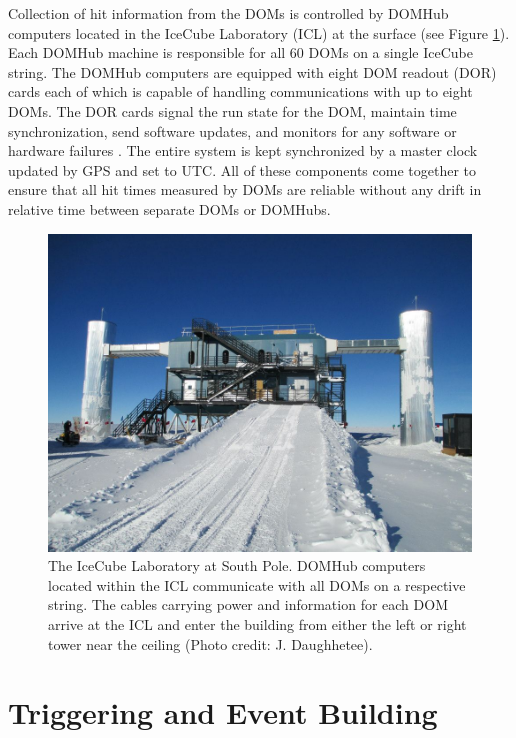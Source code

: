 \documentclass{gatech-thesis}
\begin{document}
Collection of hit information from the DOMs is controlled by DOMHub computers located in the IceCube Laboratory (ICL) at the surface (see Figure \ref{fig:icl}). Each DOMHub machine is responsible for all 60 DOMs on a single IceCube string. The DOMHub computers are equipped with eight DOM readout (DOR) cards each of which is capable of handling communications with up to eight DOMs. The DOR cards signal the run state for the DOM, maintain time synchronization, send software updates, and monitors for any software or hardware failures \cite{2009NIMPA.601..294A}. The entire system is kept synchronized by a master clock updated by GPS and set to UTC. All of these components come together to ensure that all hit times measured by DOMs are reliable without any drift in relative time between separate DOMs or DOMHubs.



\begin{figure}[ht]
  \begin{center}
    \includegraphics[width=1.0\textwidth,keepaspectratio]{ICL.jpg}
  \end{center}
  \caption[IceCube Laboratory Photo]{The IceCube Laboratory at South Pole. DOMHub computers located within the ICL communicate with all DOMs on a respective string. The cables carrying power and information for each DOM arrive at the ICL and enter the building from either the left or right tower near the ceiling (Photo credit: J. Daughhetee).}
  \label{fig:icl}
\end{figure}

\section{Triggering and Event Building}
\end{document}
